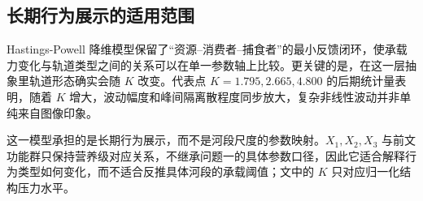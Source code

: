\subsection{长期行为展示的适用范围}
Hastings-Powell 降维模型保留了“资源--消费者--捕食者”的最小反馈闭环，使承载力变化与轨道类型之间的关系可以在单一参数轴上比较。更关键的是，在这一层抽象里轨道形态确实会随 $K$ 改变。代表点 $K=1.795,2.665,4.800$ 的后期统计量表明，随着 $K$ 增大，波动幅度和峰间隔离散程度同步放大，复杂非线性波动并非单纯来自图像印象。

这一模型承担的是长期行为展示，而不是河段尺度的参数映射。$X_1,X_2,X_3$ 与前文功能群只保持营养级对应关系，不继承问题一的具体参数口径，因此它适合解释行为类型如何变化，而不适合反推具体河段的承载阈值；文中的 $K$ 只对应归一化结构压力水平。

